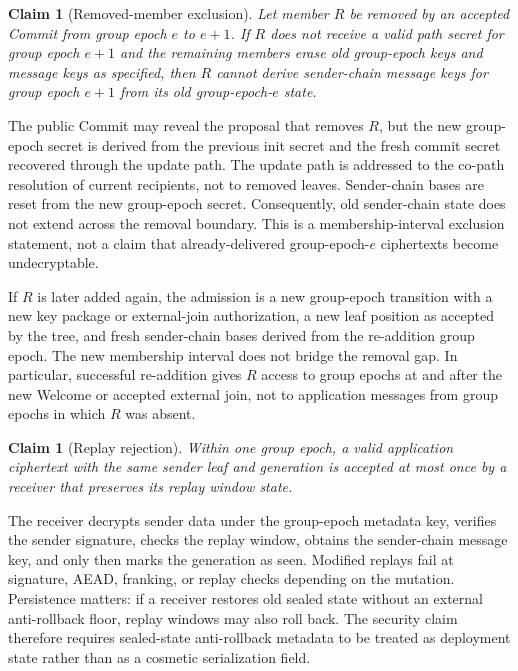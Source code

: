 \documentclass[preprint,12pt]{elsarticle}
\newtheorem{claim}[theorem]{Claim}
\theoremstyle{definition}
\begin{document}
\begin{claim}[Removed-member exclusion]
Let member $R$ be removed by an accepted Commit from group epoch $e$ to
$e+1$. If $R$ does not receive a valid path secret for group epoch $e+1$ and
the remaining members erase old group-epoch keys and message keys as specified,
then $R$ cannot derive sender-chain message keys for group epoch $e+1$ from
its old group-epoch-$e$ state.
\end{claim}

\noindent
The public Commit may reveal the proposal that removes $R$, but the new group-epoch
secret is derived from the previous init secret and the fresh commit secret
recovered through the update path. The update path is addressed to the
co-path resolution of current recipients, not to removed leaves. Sender-chain
bases are reset from the new group-epoch secret. Consequently, old sender-chain
state does not extend across the removal boundary. This is a membership-interval
exclusion statement, not a claim that already-delivered group-epoch-$e$ ciphertexts
become undecryptable.

If $R$ is later added again, the admission is a new group-epoch transition with a new
key package or external-join authorization, a new leaf position as accepted by
the tree, and fresh sender-chain bases derived from the re-addition group epoch. The
new membership interval does not bridge the removal gap. In particular,
successful re-addition gives $R$ access to group epochs at and after the new Welcome
or accepted external join, not to application messages from group epochs in which
$R$ was absent.

\begin{claim}[Replay rejection]
Within one group epoch, a valid application ciphertext with the same sender leaf and
generation is accepted at most once by a receiver that preserves its replay
window state.
\end{claim}

\noindent
The receiver decrypts sender data under the group-epoch metadata key, verifies the
sender signature, checks the replay window, obtains the sender-chain message
key, and only then marks the generation as seen. Modified replays fail at
signature, AEAD, franking, or replay checks depending on the mutation.
Persistence matters: if a receiver restores old sealed state without an
external anti-rollback floor, replay windows may also roll back. The security
claim therefore requires sealed-state anti-rollback metadata to be treated as
deployment state rather than as a cosmetic serialization field.
\end{document}
